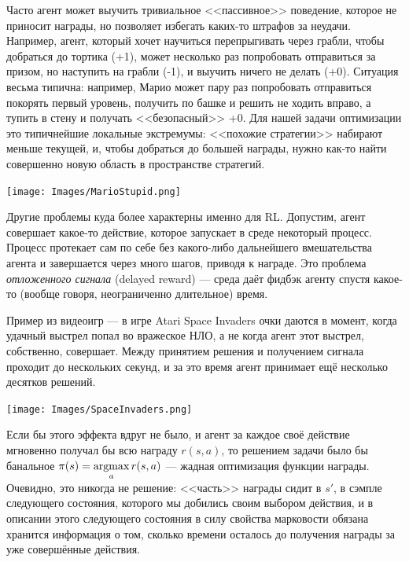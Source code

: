 \begin{exampleBox}[righthand ratio=0.25, sidebyside, sidebyside align=center, lower separated=false]{}
Часто агент может выучить тривиальное <<пассивное>> поведение, которое не приносит награды, но позволяет избегать каких-то штрафов за неудачи. Например, агент, который хочет научиться перепрыгивать через грабли, чтобы добраться до тортика (+1), может несколько раз попробовать отправиться за призом, но наступить на грабли (-1), и выучить ничего не делать (+0). Ситуация весьма типична: например, Марио может пару раз попробовать отправиться покорять первый уровень, получить по башке и решить не ходить вправо, а тупить в стену и получать <<безопасный>> +0. Для нашей задачи оптимизации это типичнейшие локальные экстремумы: <<похожие стратегии>> набирают меньше текущей, и, чтобы добраться до большей награды, нужно как-то найти совершенно новую область в пространстве стратегий.

\tcblower
\texttt{[image: Images/MarioStupid.png]}
\end{exampleBox}

Другие проблемы куда более характерны именно для RL. Допустим, агент совершает какое-то действие, которое запускает в среде некоторый процесс. Процесс протекает сам по себе без какого-либо дальнейшего вмешательства агента и завершается через много шагов, приводя к награде. Это проблема \emph{отложенного сигнала} (delayed reward) --- среда даёт фидбэк агенту спустя какое-то (вообще говоря, неограниченно длительное) время.

\begin{exampleBox}[righthand ratio=0.25, sidebyside, sidebyside align=center, lower separated=false]{}
Пример из видеоигр --- в игре Atari Space Invaders очки даются в момент, когда удачный выстрел попал во вражеское НЛО, а не когда агент этот выстрел, собственно, совершает. Между принятием решения и получением сигнала проходит до нескольких секунд, и за это время агент принимает ещё несколько десятков решений.

\tcblower
\texttt{[image: Images/SpaceInvaders.png]}
\end{exampleBox}

Если бы этого эффекта вдруг не было, и агент за каждое своё действие мгновенно получал бы всю награду $r(s, a)$, то решением задачи было бы банальное $\pi(s) = \mathop{\mathrm{argmax}}\limits_a r(s, a)$ --- жадная оптимизация функции награды. Очевидно, это никогда не решение: <<часть>> награды сидит в $s'$, в сэмпле следующего состояния, которого мы добились своим выбором действия, и в описании этого следующего состояния в силу свойства марковости обязана хранится информация о том, сколько времени осталось до получения награды за уже совершённые действия.

